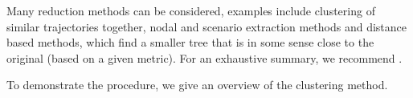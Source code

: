 Many reduction methods can be considered, examples include clustering of similar trajectories together, nodal and scenario extraction methods and distance based methods, which find a smaller tree that is in some sense close to the original (based on a given metric). For an exhaustive summary, we recommend \cite{kopa_evaluation_of_scenario_reduction_algorithms}. 

To demonstrate the procedure, we give an overview of the clustering method.
%
